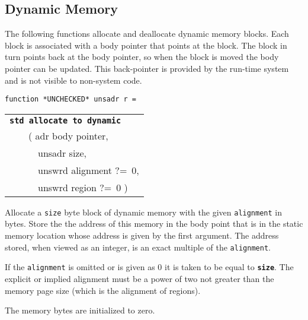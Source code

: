 \documentclass[12pt]{article}
\makeatletter
\newcommand{\TT}[1]{{\tt \bfseries #1}}
\newcommand{\ttstdkey}[1]{\TT{std #1}\index{#1@{\tt std #1}}}
\newenvironment{indpar}[1][0.3in]%
	{\begin{list}{}%
		     {\setlength{\itemsep}{0in}%
		      \setlength{\topsep}{0in}%
		      \setlength{\parsep}{1ex}%
		      \setlength{\labelwidth}{#1}%
		      \setlength{\leftmargin}{#1}%
		      \addtolength{\leftmargin}{\labelsep}}%
	 \item}%
	{\end{list}}
\makeatother
\begin{document}
\subsection{Dynamic Memory}
\label{DYNAMIC-MEMORY}


The following functions allocate and deallocate dynamic memory blocks.
Each block is associated with a body pointer that points at the
block.  The block in turn points back at the
body pointer, so when the block is moved the body pointer can be
updated.  This back-pointer is provided by the run-time
system and is not visible to non-system code.

\begin{indpar}

{\tt function *UNCHECKED* unsadr r = \begin{tabular}[t]{@{}l@{}}
				     \ttstdkey{allocate to dynamic} \\
				     ~~~~( adr body pointer, \\
				     ~~~~~~unsadr size, \\
				     ~~~~~~unswrd alignment ?=~0, \\
				     ~~~~~~unswrd region ?=~0 ) \\
				     \end{tabular}}

\begin{indpar}
Allocate a {\tt size} byte block of dynamic memory with the given
{\tt alignment} in bytes.  Store the
the address of this memory in the body point that is in the static
memory location whose address is given by the first argument.
The address stored, when viewed as an
integer, is an exact multiple of the {\tt alignment}.

If the {\tt alignment} is omitted or is given as 0 it is taken
to be equal to \TT{size}.  The explicit or implied
alignment must be a power of two not greater than the memory
page size (which is the alignment of regions).

The memory bytes are initialized to zero.
\end{indpar}


\end{indpar}
\end{document}
